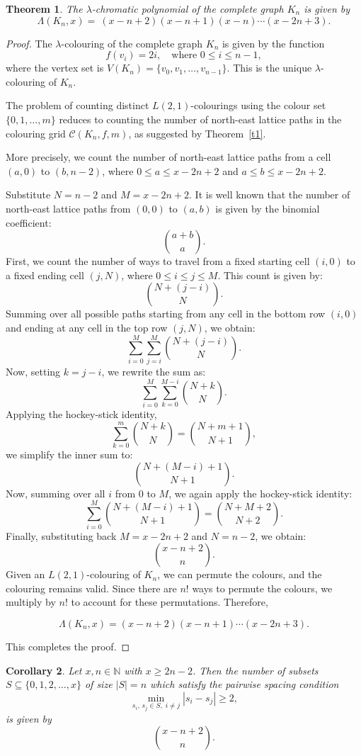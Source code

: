 \documentclass{birkjour}
\newtheorem{theorem}{Theorem}[section]
\newtheorem{Corollary}[theorem]{Corollary}
\theoremstyle{definition}
\theoremstyle{remark}
\numberwithin{equation}{section}
\begin{document}
\begin{theorem}
\label{LKN}
The \( \lambda \)-chromatic polynomial of the complete graph \( K_n \) is given by
\[
\Lambda(K_n, x) = \ (x - n + 2)(x - n + 1)(x-n) \cdots (x - 2n + 3).
\]
\end{theorem}
\begin{proof}
The $\lambda$-colouring of the complete graph \( K_n \) is given by the function
\[
f(v_i) = 2i, \quad \text{where } 0 \leq i \leq n-1,
\]
where the vertex set is \( V(K_n) = \{v_0, v_1, \dots, v_{n-1}\} \). This is the unique $\lambda$-colouring of \( K_n \).

The problem of counting distinct $L(2,1)$-colourings using the colour set \( \{0,1, \dots, m\} \) reduces to counting the number of north-east lattice paths in the colouring grid \( \mathcal{C}(K_n, f, m) \), as suggested by Theorem~\ref{t1}.

More precisely, we count the number of north-east lattice paths from a cell \( (a,0) \) to \( (b,n-2) \), where \( 0 \leq a \leq x - 2n + 2 \) and \( a \leq b \leq x - 2n + 2 \).

Substitute \( N = n - 2 \) and \( M = x - 2n + 2 \). It is well known that the number of north-east lattice paths from \( (0,0) \) to \( (a,b) \) is given by the binomial coefficient:
\[
\binom{a+b}{a}.
\]
First, we count the number of ways to travel from a fixed starting cell \( (i,0) \) to a fixed ending cell \( (j,N) \), where \( 0 \leq i \leq j \leq M \). This count is given by:
\[
\binom{N+(j-i)}{N}.
\]
Summing over all possible paths starting from any cell in the bottom row \( (i,0) \) and ending at any cell in the top row \( (j,N) \), we obtain:
\[
\sum\limits_{i=0}^{M} \sum\limits_{j=i}^{M} \binom{N+(j-i)}{N}.
\]
Now, setting \( k = j - i \), we rewrite the sum as:
\[
\sum\limits_{i=0}^{M} \sum\limits_{k=0}^{M-i} \binom{N+k}{N}.
\]
Applying the hockey-stick identity,
\[
\sum\limits_{k=0}^{m} \binom{N+k}{N} = \binom{N+m+1}{N+1},
\]
we simplify the inner sum to:
\[
\binom{N+(M-i)+1}{N+1}.
\]
Now, summing over all \( i \) from \( 0 \) to \( M \), we again apply the hockey-stick identity:
\[
\sum\limits_{i=0}^{M} \binom{N+(M-i)+1}{N+1} = \binom{N+M+2}{N+2}.
\]
Finally, substituting back \( M = x- 2n + 2 \) and \( N = n - 2 \), we obtain:
\[
\binom{x-n+2}{n}.
\]
Given an $L(2,1)$-colouring of \( K_n \), we can permute the colours, and the colouring remains valid. Since there are \( n! \) ways to permute the colours, we multiply by \( n! \) to account for these permutations. Therefore,

\[
\Lambda(K_n, x) = (x-n+2)(x-n+1)\cdots (x-2n+3).
\]

 This completes the proof.
\end{proof}
\begin{Corollary}
Let \( x, n \in \mathbb{N} \) with \( x \geq 2n - 2 \). Then the number of subsets \( S \subseteq \{0, 1, 2, \dots, x\} \) of size \( |S| = n \) which satisfy the pairwise spacing condition
\[
\min_{s_i,\, s_j \in S,\; i \neq j} |s_i - s_j| \geq 2,
\] is given by
\[
\binom{x - n + 2}{n}.
\]
\end{Corollary}
\end{document}
